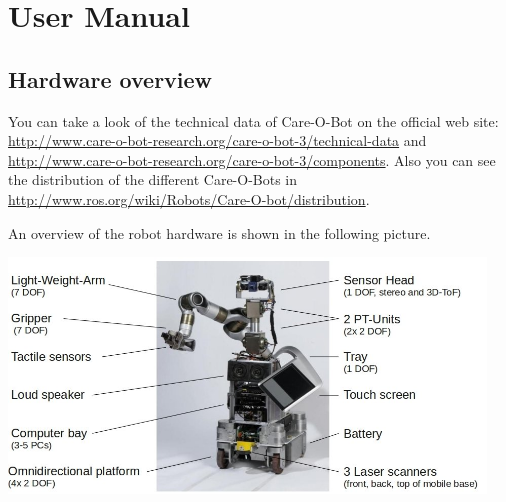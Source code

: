 \chapter{User Manual}
\label{chap:user}    
     
\section{Hardware overview}
You can take a look of the technical data of Care-O-Bot on the official web site: \url{http://www.care-o-bot-research.org/care-o-bot-3/technical-data} and \url{http://www.care-o-bot-research.org/care-o-bot-3/components}. Also you can see the distribution of the different Care-O-Bots in \url{http://www.ros.org/wiki/Robots/Care-O-bot/distribution}.

An overview of the robot hardware is shown in the following picture.
\begin{center}
 \includegraphics[width=0.95\textwidth]{images/hardware_overview.jpg}
\end{center}

